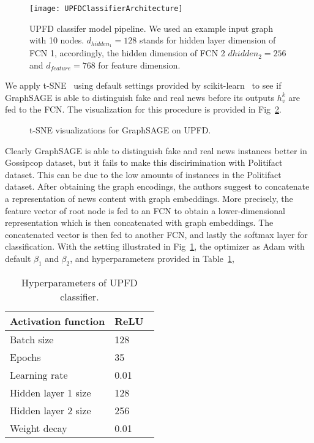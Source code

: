 \begin{figure}
    \centering
    \texttt{[image: UPFDClassifierArchitecture]}
    \caption[UPFD classifier model pipeline]{UPFD classifer model pipeline. We used an example input graph with 10 nodes. $d_{hidden_1} = 128$ stands for hidden layer dimension of FCN 1, accordingly, the hidden dimension of FCN 2 $d{hidden_2} = 256$ and $d_{feature} = 768$ for feature dimension.}
    \label{fig:UPFDClassifierArchitecture}
\end{figure}
We apply t-SNE~\parencite{tSNE_vanDerMaaten} using default settings provided by scikit-learn~\parencite{ScikitLearn_Pedregosa} to see if GraphSAGE is able to distinguish fake and real news before its outputs $h_v^k$ are fed to the FCN. The visualization for this procedure is provided in Fig~\ref{fig:TSNE_GraphSAGE}.
\begin{figure}
    \centering
    \hfill
    \caption[t-SNE visualizations for GraphSAGE]{t-SNE visualizations for GraphSAGE on UPFD.}
    \label{fig:TSNE_GraphSAGE}
\end{figure}
Clearly GraphSAGE is able to distinguish fake and real news instances better in Gossipcop dataset, but it fails to make this discirimination with Politifact dataset. This can be due to the low amounts of instances in the Politifact dataset. After obtaining the graph encodings, the authors suggest to concatenate a representation of news content with graph embeddings. More precisely, the feature vector of root node is fed to an FCN to obtain a lower-dimensional representation which is then concatenated with graph embeddings. The concatenated vector is then fed to another FCN, and lastly the softmax layer for classification. With the setting illustrated in Fig~\ref{fig:UPFDClassifierArchitecture}, the optimizer as Adam with default $\beta_1$ and $\beta_2$, and hyperparameters provided in Table~\ref{tab:UPFDClassifier_Hyperparameters},
\begin{table}
    \centering
    \begin{tabular}{|l|l|}
        \hline
        Activation function & ReLU~\parencite{ReLU_Nair} \\
        \hline
        Batch size          & 128                        \\
        \hline
        Epochs              & 35                         \\
        \hline
        Learning rate       & 0.01                       \\
        \hline
        Hidden layer 1 size & 128                        \\
        \hline
        Hidden layer 2 size & 256                        \\
        \hline
        Weight decay        & 0.01                       \\
        \hline
    \end{tabular}
    \caption[Hyperparameters of UPFD classifier.]{Hyperparameters of UPFD classifier.}
    \label{tab:UPFDClassifier_Hyperparameters}
\end{table}
